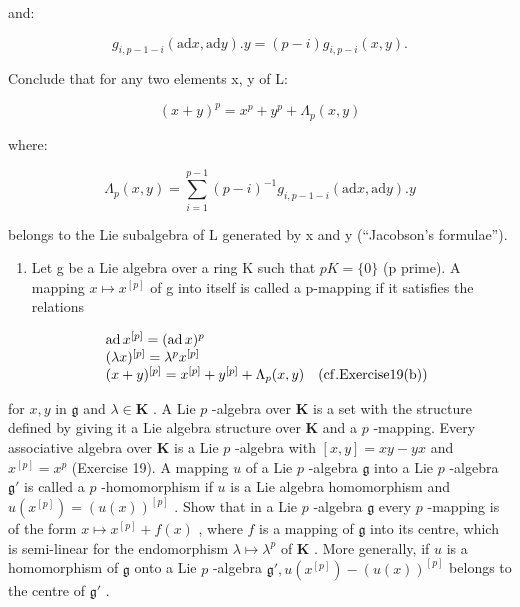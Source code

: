 and:

\[
g _ {i, p - 1 - i} (\mathrm{ad} x, \mathrm{ad} y). y = (p - i) g _ {i, p - i} (x, y).
\]

Conclude that for any two elements x, y of L:

\[
(x + y) ^ {p} = x ^ {p} + y ^ {p} + \Lambda_ {p} (x, y)\tag{3}
\]

where:

\[
\Lambda_ {p} (x, y) = \sum_ {i = 1} ^ {p - 1} (p - i) ^ {- 1} g _ {i, p - 1 - i} (\mathrm{ad} x, \mathrm{ad} y). y
\]

belongs to the Lie subalgebra of L generated by x and y (``Jacobson's formulae'').

\begin{enumerate}
\def\labelenumi{\arabic{enumi}.}
\setcounter{enumi}{19}
\tightlist
\item
  Let g be a Lie algebra over a ring K such that \(pK = \{0\}\) (p prime). A mapping \(x \mapsto x^{[p]}\) of g into itself is called a p-mapping if it satisfies the relations
\end{enumerate}

\[
\begin{array}{r l} & {\operatorname{ad} x ^ {[ p ]} = (\operatorname{ad} x) ^ {p}} \\ & {(\lambda x) ^ {[ p ]} = \lambda^ {p} x ^ {[ p ]}} \\ & {(x + y) ^ {[ p ]} = x ^ {[ p ]} + y ^ {[ p ]} + \Lambda_ {p} (x, y) \quad (\mathrm{cf.Exercise19(b)})} \end{array}
\]

  for \(x, y\) in \(\mathfrak{g}\) and \(\lambda \in \mathbf{K}\) . A Lie \(p\) -algebra over \(\mathbf{K}\) is a set with the structure defined by giving it a Lie algebra structure over \(\mathbf{K}\) and a \(p\) -mapping. Every associative algebra over \(\mathbf{K}\) is a Lie \(p\) -algebra with \([x, y] = xy - yx\) and \(x^{[p]} = x^p\) (Exercise 19). A mapping \(u\) of a Lie \(p\) -algebra \(\mathfrak{g}\) into a Lie \(p\) -algebra \(\mathfrak{g}'\) is called a \(p\) -homomorphism if \(u\) is a Lie algebra homomorphism and \(u(x^{[p]}) = (u(x))^{[p]}\) . Show that in a Lie \(p\) -algebra \(\mathfrak{g}\) every \(p\) -mapping is of the form \(x \mapsto x^{[p]} + f(x)\) , where \(f\) is a mapping of \(\mathfrak{g}\) into its centre, which is semi-linear for the endomorphism \(\lambda \mapsto \lambda^p\) of \(\mathbf{K}\) . More generally, if \(u\) is a homomorphism of \(\mathfrak{g}\) onto a Lie \(p\) -algebra \(\mathfrak{g}', u(x^{[p]}) - (u(x))^{[p]}\) belongs to the centre of \(\mathfrak{g}'\) .

